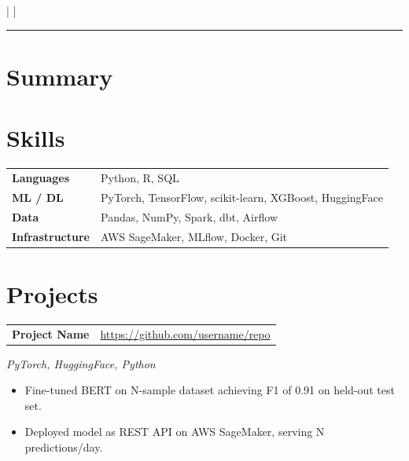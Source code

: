\documentclass[10pt, a4paper]{article}
\makeatletter
\newcommand{\contactitem}[1]{\small #1}
\newcommand{\projectentry}[4]{%
  \noindent
  \begin{tabularx}{\linewidth}{@{}X r@{}}
    \textbf{#1} & \href{#3}{\textcolor{subtle}{\small #3}}
  \end{tabularx}
  \vspace{1pt}
  \textcolor{subtle}{\small \textit{#2}}
  \vspace{1pt}
  #4
  \vspace{6pt}
}
\makeatother
\begin{document}

\begin{center}
  {\LARGE\bfseries\color{accent} \VarName}\\[4pt]
  {\small \VarRole}\\[6pt]
  \contactitem{\VarEmail}
  \quad\textcolor{subtle}{|}\quad
  \contactitem{\VarPhone}
  \quad\textcolor{subtle}{|}\quad
  \contactitem{\VarLocation}
\end{center}

\vspace{4pt}
\textcolor{accent}{\rule{\linewidth}{0.8pt}}
\vspace{6pt}

\section{Summary}
\VarSummary

\section{Skills}
\noindent
\begin{tabularx}{\linewidth}{@{} l X @{}}
  \textbf{Languages}      & Python, R, SQL \\[2pt]
  \textbf{ML / DL}        & PyTorch, TensorFlow, scikit-learn, XGBoost, HuggingFace \\[2pt]
  \textbf{Data}           & Pandas, NumPy, Spark, dbt, Airflow \\[2pt]
  \textbf{Infrastructure} & AWS SageMaker, MLflow, Docker, Git \\
\end{tabularx}

\section{Projects}
\projectentry{Project Name}{PyTorch, HuggingFace, Python}{https://github.com/username/repo}{%
  \begin{itemize}
    \item Fine-tuned BERT on N-sample dataset achieving F1 of 0.91 on held-out test set.
    \item Deployed model as REST API on AWS SageMaker, serving N predictions/day.
  \end{itemize}
}
\end{document}
